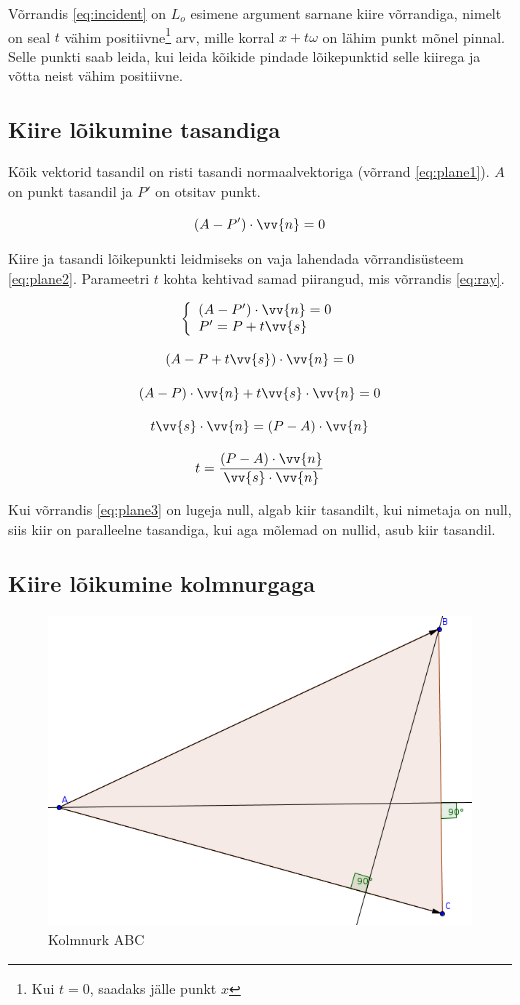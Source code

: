 \documentclass[a4paper,12pt]{report}
\renewcommand{\vec}[1]{\vv{#1}}
\begin{document}
Võrrandis \ref{eq:incident} on \(L_o\) esimene argument sarnane kiire
võrrandiga, nimelt on seal \(t\) vähim positiivne\footnote{Kui \(t=0\),
saadaks jälle punkt \(x\)} arv, mille korral \(x + t\omega\) on lähim
punkt mõnel pinnal. Selle punkti saab leida, kui leida kõikide pindade
lõikepunktid selle kiirega ja võtta neist vähim positiivne.

\subsection{Kiire lõikumine tasandiga}
Kõik vektorid tasandil on risti tasandi normaalvektoriga (võrrand
\ref{eq:plane1}). \(A\) on punkt tasandil ja \(P'\) on otsitav punkt.

\begin{equation} \label{eq:plane1}
(A - P') \cdot \vec n = 0
\end{equation}

Kiire ja tasandi lõikepunkti leidmiseks on vaja lahendada võrrandisüsteem
\ref{eq:plane2}. Para\-meetri \(t\) kohta kehtivad samad piirangud, mis
võrrandis \ref{eq:ray}.

\begin{equation} \label{eq:plane2}
\left\{
\begin{array}{l}
(A - P') \cdot \vec n = 0 \\
P' = P + t\vec s
\end{array}
\right.
\end{equation}

\[(A - P + t\vec s) \cdot \vec n = 0\]

\[(A - P) \cdot \vec n + t\vec s \cdot \vec n = 0\]

\[t\vec s \cdot \vec n = (P-A) \cdot \vec n\]

\begin{equation} \label{eq:plane3}
t = \frac{(P-A) \cdot \vec n}{\vec s \cdot \vec n}
\end{equation}

Kui võrrandis \ref{eq:plane3} on lugeja null, algab kiir tasandilt, kui
nimetaja on null, siis kiir on paralleelne tasandiga, kui aga mõlemad on
nullid, asub kiir tasandil.

\subsection{Kiire lõikumine kolmnurgaga}

\begin{figure}
\includegraphics[width=0.49	\textwidth]{tri}
\caption{Kolmnurk ABC}
\label{fig:tri}
\end{figure}
\end{document}
